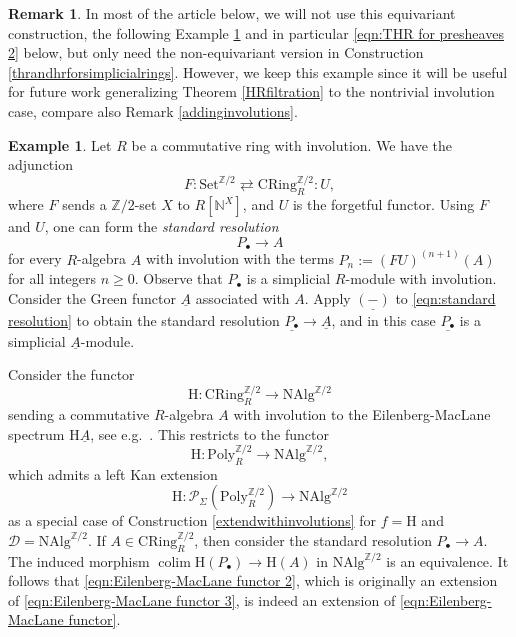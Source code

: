 \documentclass[10pt]{amsart}
\theoremstyle{definition}
\newtheorem{rmk}[thm]{Remark}
\newtheorem{exm}[thm]{Example}
\numberwithin{equation}{section}
\newcommand{\N}{\mathbb{N}}
\newcommand{\Z}{\mathbb{Z}}
\newcommand{\cD}{\mathcal{D}}
\newcommand{\cP}{\mathcal{P}}
\newcommand{\rH}{\mathrm{H}}
\newcommand{\ul}{\underline}
\newcommand{\CRing}{\mathrm{CRing}}
\newcommand{\NAlg}{\mathrm{NAlg}}
\newcommand{\Poly}{\mathrm{Poly}}
\newcommand{\Set}{\mathrm{Set}}
\newcommand{\colim}{\mathop{\mathrm{colim}}}
\begin{document}
\begin{rmk}
In most of the article below, we will not use
this equivariant construction, the following Example \ref{equiexample} and in particular
\eqref{eqn:THR for presheaves 2} below, but only need the non-equivariant version in Construction \ref{thrandhrforsimplicialrings}.
However, we keep this example since it will be useful for future work generalizing Theorem \ref{HRfiltration} to the nontrivial involution case, compare also Remark \ref{addinginvolutions}.
\end{rmk}


\begin{exm}\label{equiexample}
\label{exm:THR is a left Kan extension}
Let $R$ be a commutative ring with involution.
We have the adjunction
\[
F:
\Set^{\Z/2}
\rightleftarrows
\CRing_R^{\Z/2}
:
U,
\]
where $F$ sends a $\Z/2$-set $X$ to $R[\N^X]$, and $U$ is the forgetful functor.
Using $F$ and $U$,
one can form the \emph{standard resolution} \cite[\href{https://stacks.math.columbia.edu/tag/08N8}{Tag 08N8}]{stacks}
\begin{equation}
\label{eqn:standard resolution}
P_\bullet
\to
A
\end{equation}
for every $R$-algebra $A$ with involution with the terms $P_n:=(FU)^{(n+1)}(A)$ for all integers $n\geq 0$.
Observe that $P_\bullet$ is a simplicial $R$-module with involution.
Consider the Green functor $\ul{A}$ associated with $A$.
Apply $\ul{(-)}$ to \eqref{eqn:standard resolution} to obtain the standard resolution $\ul{P_\bullet}\to \ul{A}$,
and in this case $\ul{P_\bullet}$ is a simplicial $\ul{A}$-module.

Consider the functor
\begin{equation}
\label{eqn:Eilenberg-MacLane functor}
\rH
\colon
\CRing_R^{\Z/2}
\to
\NAlg^{\Z/2}
\end{equation}
sending a commutative $R$-algebra $A$ with involution to the Eilenberg-MacLane spectrum $\rH \ul{A}$, see e.g.\ \cite[Definition 2.3.2]{HP23}.
This restricts to the functor
\begin{equation}
\label{eqn:Eilenberg-MacLane functor 3}
\rH
\colon
\Poly_R^{\Z/2}
\to
\NAlg^{\Z/2},
\end{equation}
which admits a left Kan extension 
\begin{equation}
\label{eqn:Eilenberg-MacLane functor 2}
\rH
\colon
\cP_\Sigma(\Poly_R^{\Z/2})
\to
\NAlg^{\Z/2}
\end{equation}
as a special case of Construction \ref{extendwithinvolutions} for $f=\rH$ and $\cD=\NAlg^{\Z/2}$.
If $A\in \CRing_R^{\Z/2}$,
then consider the standard resolution $P_\bullet\to A$.
The induced morphism $\colim \rH(P_\bullet)\to \rH(A)$ in $\NAlg^{\Z/2}$ is an equivalence.
It follows that
\eqref{eqn:Eilenberg-MacLane functor 2},
which is originally an extension of \eqref{eqn:Eilenberg-MacLane functor 3},
is indeed an extension of \eqref{eqn:Eilenberg-MacLane functor}.


\end{exm}
\end{document}
